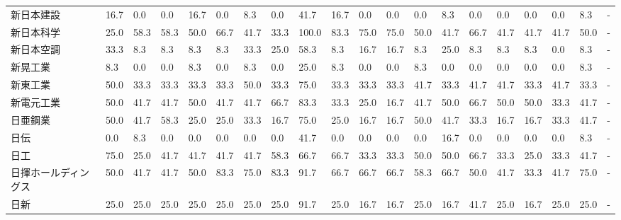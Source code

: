 \documentclass[a4paper，11pt]{jsarticle}
\begin{document}
\begin{longtable}[c]{lp{3mm}p{3mm}p{3mm}p{3mm}p{3mm}p{3mm}p{3mm}p{3mm}p{3mm}p{3mm}p{3mm}p{3mm}p{3mm}p{3mm}p{3mm}p{3mm}p{3mm}p{3mm}p{3mm}}
新日本建設           &   16.7 &    0.0 &       0.0 &      16.7 &        0.0 &    8.3 &    0.0 &   41.7 &    16.7 &     0.0 &    0.0 &   0.0 &    8.3 &     0.0 &     0.0 &   0.0 &   0.0 &   8.3 &     - \\
新日本科学           &   25.0 &   58.3 &      58.3 &      50.0 &       66.7 &   41.7 &   33.3 &  100.0 &    83.3 &    75.0 &   75.0 &  50.0 &   41.7 &    66.7 &    41.7 &  41.7 &  41.7 &  50.0 &     - \\
新日本空調           &   33.3 &    8.3 &       8.3 &       8.3 &        8.3 &   33.3 &   25.0 &   58.3 &     8.3 &    16.7 &   16.7 &   8.3 &   25.0 &     8.3 &     8.3 &   8.3 &   0.0 &   8.3 &     - \\
新晃工業            &    8.3 &    0.0 &       0.0 &       8.3 &        0.0 &    8.3 &    0.0 &   25.0 &     8.3 &     0.0 &    0.0 &   8.3 &    0.0 &     0.0 &     0.0 &   0.0 &   0.0 &   8.3 &     - \\
新東工業            &   50.0 &   33.3 &      33.3 &      33.3 &       33.3 &   50.0 &   33.3 &   75.0 &    33.3 &    33.3 &   33.3 &  41.7 &   33.3 &    41.7 &    41.7 &  33.3 &  41.7 &  33.3 &     - \\
新電元工業           &   50.0 &   41.7 &      41.7 &      50.0 &       41.7 &   41.7 &   66.7 &   83.3 &    33.3 &    25.0 &   16.7 &  41.7 &   50.0 &    66.7 &    50.0 &  50.0 &  33.3 &  41.7 &     - \\
日亜鋼業            &   50.0 &   41.7 &      58.3 &      25.0 &       25.0 &   33.3 &   16.7 &   75.0 &    25.0 &    16.7 &   16.7 &  50.0 &   41.7 &    33.3 &    16.7 &  16.7 &  33.3 &  41.7 &     - \\
日伝              &    0.0 &    8.3 &       0.0 &       0.0 &        0.0 &    0.0 &    0.0 &   41.7 &     0.0 &     0.0 &    0.0 &   0.0 &   16.7 &     0.0 &     0.0 &   0.0 &   0.0 &   8.3 &     - \\
日工              &   75.0 &   25.0 &      41.7 &      41.7 &       41.7 &   41.7 &   58.3 &   66.7 &    66.7 &    33.3 &   33.3 &  50.0 &   50.0 &    66.7 &    33.3 &  25.0 &  33.3 &  41.7 &     - \\
日揮ホールディングス      &   50.0 &   41.7 &      41.7 &      50.0 &       83.3 &   75.0 &   83.3 &   91.7 &    66.7 &    66.7 &   66.7 &  58.3 &   66.7 &    50.0 &    41.7 &  33.3 &  41.7 &  75.0 &     - \\
日新              &   25.0 &   25.0 &      25.0 &      25.0 &       25.0 &   25.0 &   25.0 &   91.7 &    25.0 &    16.7 &   16.7 &  25.0 &   16.7 &    41.7 &    25.0 &  16.7 &  25.0 &  25.0 &     - \\

\end{longtable}
\end{document}
